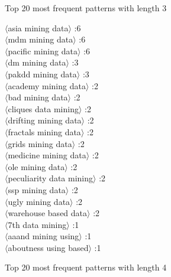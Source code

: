 \documentclass[11pt,a4paper,fleqn]{article}
\begin{document}
Top 20 most frequent patterns with length 3
\begin{multicols}{3} \noindent
$\langle$asia mining data$\rangle$ :6\\
$\langle$mdm mining data$\rangle$ :6\\
$\langle$pacific mining data$\rangle$ :6\\
$\langle$dm mining data$\rangle$ :3\\
$\langle$pakdd mining data$\rangle$ :3\\
$\langle$academy mining data$\rangle$ :2\\
$\langle$bad mining data$\rangle$ :2\\
$\langle$cliques data mining$\rangle$ :2\\
$\langle$drifting mining data$\rangle$ :2\\
$\langle$fractals mining data$\rangle$ :2\\
$\langle$grids mining data$\rangle$ :2\\
$\langle$medicine mining data$\rangle$ :2\\
$\langle$ole mining data$\rangle$ :2\\
$\langle$peculiarity data mining$\rangle$ :2\\
$\langle$ssp mining data$\rangle$ :2\\
$\langle$ugly mining data$\rangle$ :2\\
$\langle$warehouse based data$\rangle$ :2\\
$\langle$7th data mining$\rangle$ :1\\
$\langle$aaand mining using$\rangle$ :1\\
$\langle$aboutness using based$\rangle$ :1\\
\end{multicols} \noindent
Top 20 most frequent patterns with length 4
\end{document}
